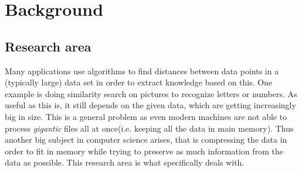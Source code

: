 \section{Background}
\label{background}

\subsection{Research area}
\label{research_area}
Many applications use algorithms to find distances between data points in a (typically large) data set in order to extract knowledge based on this. One example is doing similarity search on pictures to recognize letters or numbers. As useful as this is, it still depends on the given data, which are getting increasingly big in size. This is a general problem as even modern machines are not able to process \textit{gigantic} files all at once(i.e. keeping all the data in main memory). Thus another big subject in computer science arises, that is compressing the data in order to fit in memory while trying to preserve as much information from the data as possible. This research area is what \qs{} specifically deals with.



